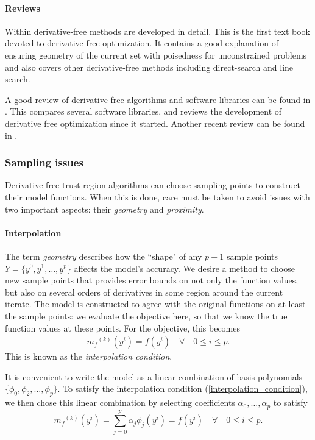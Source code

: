 \documentclass{article}
\theoremstyle{case}
\newcommand{\modelk}{{{m}_f}^{(k)}}
\let\oldref\ref
\renewcommand{\ref}[1]{(\oldref{#1})}
\begin{document}
\paragraph{Reviews}
Within \cite{DUMMY:intro_book} derivative-free methods are developed in detail.
This is the first text book devoted to derivative free optimization.
It contains a good explanation of ensuring geometry of the current set with poisedness for unconstrained problems and also covers other derivative-free methods including direct-search and line search.

A good review of derivative free algorithms and software libraries can be found in \cite{DUMMY:review}.
This compares several software libraries, and reviews the development of derivative free optimization since it started.
Another recent review can be found in \cite{DUMMY:review2}.


\subsubsection{Sampling issues}
Derivative free trust region algorithms can choose sampling points to construct their model functions.
When this is done, care must be taken to avoid issues with two important aspects: their \emph{geometry} and \emph{proximity}.

\paragraph{Interpolation}
\label{geometry}
The term \emph{geometry} describes how the ``shape" of any $p+1$ sample points $Y = \{y^0, y^1, \ldots, y^p\}$ affects the model's accuracy.
We desire a method to choose new sample points that provides error bounds on not only the function values, but also on several orders of derivatives in some region around the current iterate.
The model is constructed to agree with the original functions on at least the sample points: we evaluate the objective here, so that we know the true function values at these points.
For the objective, this becomes
\begin{align}
\label{interpolation_condition}
\modelk(y^i) = f(y^i) \quad \forall \quad 0 \le i \le p.
\end{align}
This is known as the \emph{interpolation condition}.

It is convenient to write the model as a linear combination of basis polynomials $\{\phi_0, \phi_2, \ldots, \phi_p\}$.
To satisfy the interpolation condition \ref{interpolation_condition}, we then chose this linear combination by selecting coefficients $\alpha_0, \ldots, \alpha_p$ to satisfy
\[
    \modelk(y^i) = \sum^p_{j=0}\alpha_j\phi_j(y^i) = f(y^i) \quad \forall \quad 0 \le i \le p.
\]
\end{document}
